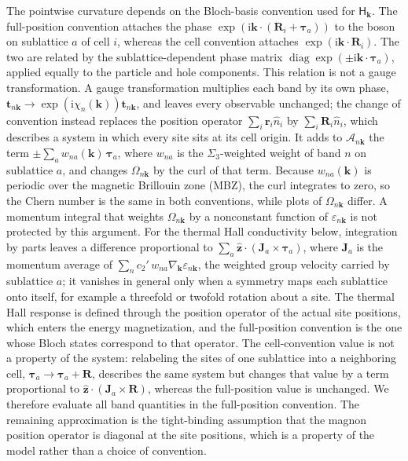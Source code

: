 The pointwise curvature depends on the Bloch-basis convention used for \(\mathsf H_{\mathbf k}\). The full-position convention attaches the phase \(\exp(\mathrm i\mathbf k\cdot(\mathbf R_i+\boldsymbol\tau_a))\) to the boson on sublattice \(a\) of cell \(i\), whereas the cell convention attaches \(\exp(\mathrm i\mathbf k\cdot\mathbf R_i)\). The two are related by the sublattice-dependent phase matrix \(\operatorname{diag}\exp(\pm\mathrm i\mathbf k\cdot\boldsymbol\tau_a)\), applied equally to the particle and hole components. This relation is not a gauge transformation. A gauge transformation multiplies each band by its own phase, \(\mathbf t_{n\mathbf k}\to\exp(\mathrm i\chi_n(\mathbf k))\mathbf t_{n\mathbf k}\), and leaves every observable unchanged; the change of convention instead replaces the position operator \(\sum_i\mathbf r_i\hat n_i\) by \(\sum_i\mathbf R_i\hat n_i\), which describes a system in which every site sits at its cell origin. It adds to \(\mathcal A_{n\mathbf k}\) the term \(\pm\sum_a w_{na}(\mathbf k)\,\boldsymbol\tau_a\), where \(w_{na}\) is the \(\Sigma_3\)-weighted weight of band \(n\) on sublattice \(a\), and changes \(\Omega_{n\mathbf k}\) by the curl of that term. Because \(w_{na}(\mathbf k)\) is periodic over the magnetic Brillouin zone (MBZ), the curl integrates to zero, so the Chern number is the same in both conventions, while plots of \(\Omega_{n\mathbf k}\) differ. A momentum integral that weights \(\Omega_{n\mathbf k}\) by a nonconstant function of \(\varepsilon_{n\mathbf k}\) is not protected by this argument. For the thermal Hall conductivity below, integration by parts leaves a difference proportional to \(\sum_a\hat{\mathbf z}\cdot(\mathbf J_a\times\boldsymbol\tau_a)\), where \(\mathbf J_a\) is the momentum average of \(\sum_nc_2'\,w_{na}\nabla_{\mathbf k}\varepsilon_{n\mathbf k}\), the weighted group velocity carried by sublattice \(a\); it vanishes in general only when a symmetry maps each sublattice onto itself, for example a threefold or twofold rotation about a site. The thermal Hall response is defined through the position operator of the actual site positions, which enters the energy magnetization, and the full-position convention is the one whose Bloch states correspond to that operator. The cell-convention value is not a property of the system: relabeling the sites of one sublattice into a neighboring cell, \(\boldsymbol\tau_a\to\boldsymbol\tau_a+\mathbf R\), describes the same system but changes that value by a term proportional to \(\hat{\mathbf z}\cdot(\mathbf J_a\times\mathbf R)\), whereas the full-position value is unchanged. We therefore evaluate all band quantities in the full-position convention. The remaining approximation is the tight-binding assumption that the magnon position operator is diagonal at the site positions, which is a property of the model rather than a choice of convention.

